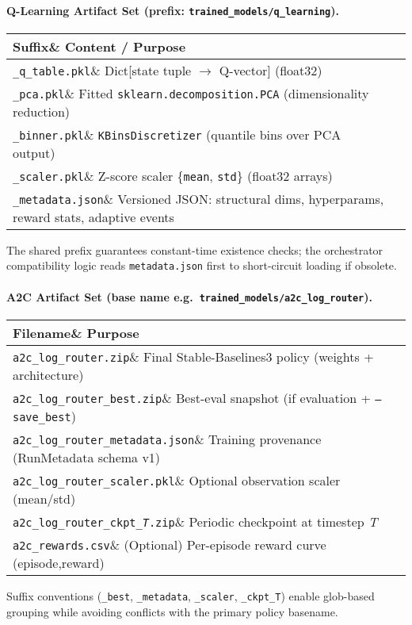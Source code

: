 \paragraph{Q-Learning Artifact Set (prefix: \texttt{trained\_models/q\_learning}).}
\begin{center}
\begin{tabular}{ll}
\textbf{Suffix}\& \textbf{Content / Purpose} \\
\hline
\texttt{\_q\_table.pkl}\& Dict[state tuple $\rightarrow$ Q-vector] (float32) \\
\texttt{\_pca.pkl}\& Fitted \texttt{sklearn.decomposition.PCA} (dimensionality reduction) \\
\texttt{\_binner.pkl}\& \texttt{KBinsDiscretizer} (quantile bins over PCA output) \\
\texttt{\_scaler.pkl}\& Z-score scaler \{\texttt{mean}, \texttt{std}\} (float32 arrays) \\
\texttt{\_metadata.json}\& Versioned JSON: structural dims, hyperparams, reward stats, adaptive events \\
\end{tabular}
\end{center}
The shared prefix guarantees constant-time existence checks; the orchestrator compatibility logic reads \texttt{metadata.json} first to short-circuit loading if obsolete.

\paragraph{A2C Artifact Set (base name e.g.\ \texttt{trained\_models/a2c\_log\_router}).}
\begin{center}
\begin{tabular}{ll}
\textbf{Filename}\& \textbf{Purpose} \\
\hline
\texttt{a2c\_log\_router.zip}\& Final Stable-Baselines3 policy (weights + architecture) \\
\texttt{a2c\_log\_router\_best.zip}\& Best-eval snapshot (if evaluation + \texttt{--save\_best}) \\
\texttt{a2c\_log\_router\_metadata.json}\& Training provenance (RunMetadata schema v1) \\
\texttt{a2c\_log\_router\_scaler.pkl}\& Optional observation scaler (mean/std) \\
\texttt{a2c\_log\_router\_ckpt\_\emph{T}.zip}\& Periodic checkpoint at timestep \emph{T} \\
\texttt{a2c\_rewards.csv}\& (Optional) Per-episode reward curve (episode,reward) \\
\end{tabular}
\end{center}
Suffix conventions (\texttt{\_best}, \texttt{\_metadata}, \texttt{\_scaler}, \texttt{\_ckpt\_T}) enable glob-based grouping while avoiding conflicts with the primary policy basename.

